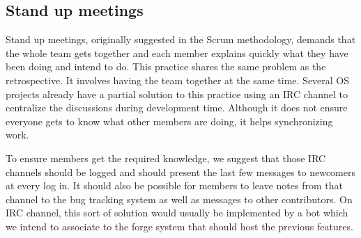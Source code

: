 \subsection{Stand up meetings}
\label{subsec:stand-up}

Stand up meetings, originally suggested in the Scrum methodology,
demands that the whole team gets together and each member explains
quickly what they have been doing and intend to do. This practice
shares the same problem as the retrospective. It involves having the
team together at the same time. Several OS projects already have a
partial solution to this practice using an IRC channel to centralize
the discussions during development time. Although it does not ensure
everyone gets to know what other members are doing, it helps
synchronizing work.

To ensure members get the required knowledge, we suggest that those
IRC channels should be logged and should present the last few messages
to newcomers at every log in. It should also be possible for members
to leave notes from that channel to the bug tracking system as well as
messages to other contributors. On IRC channel, this sort of solution
would usually be implemented by a bot which we intend to associate to
the forge system that should host the previous features.
